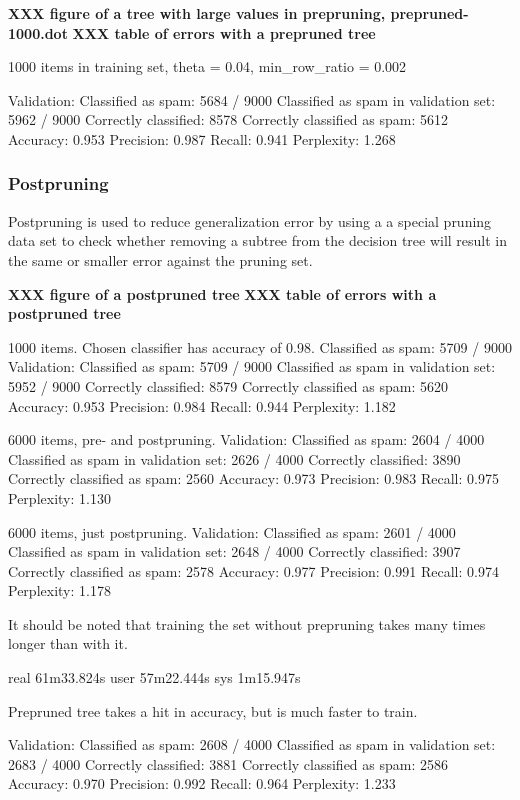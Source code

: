 \documentclass[a4paper,10pt]{article}
\newcommand{\XXX}[1]{{\bf XXX #1}}
\begin{document}
\XXX{figure of a tree with large values in prepruning, prepruned-1000.dot}
\XXX{table of errors with a prepruned tree}

1000 items in training set, theta = 0.04, min\_row\_ratio = 0.002


Validation:
 Classified as spam: 5684 / 9000
 Classified as spam in validation set: 5962 / 9000
 Correctly classified: 8578
 Correctly classified as spam: 5612
 Accuracy: 0.953
 Precision: 0.987
 Recall: 0.941
 Perplexity: 1.268

\subsubsection{Postpruning}
\label{sect:postpruning}

Postpruning is used to reduce generalization error by using a a special
pruning data set to check whether removing a subtree from the decision
tree will result in the same or smaller error against the pruning set.

\XXX{figure of a postpruned tree}
\XXX{table of errors with a postpruned tree}

1000 items.
Chosen classifier has accuracy of 0.98.
Classified as spam: 5709 / 9000
Validation:
 Classified as spam: 5709 / 9000
 Classified as spam in validation set: 5952 / 9000
 Correctly classified: 8579
 Correctly classified as spam: 5620
 Accuracy: 0.953
 Precision: 0.984
 Recall: 0.944
 Perplexity: 1.182

6000 items, pre- and postpruning.
Validation:
 Classified as spam: 2604 / 4000
 Classified as spam in validation set: 2626 / 4000
 Correctly classified: 3890
 Correctly classified as spam: 2560
 Accuracy: 0.973
 Precision: 0.983
 Recall: 0.975
 Perplexity: 1.130

6000 items, just postpruning.
Validation:
 Classified as spam: 2601 / 4000
 Classified as spam in validation set: 2648 / 4000
 Correctly classified: 3907
 Correctly classified as spam: 2578
 Accuracy: 0.977
 Precision: 0.991
 Recall: 0.974
 Perplexity: 1.178

It should be noted that training the set without prepruning takes many
times longer than with it.

real	61m33.824s
user	57m22.444s
sys	1m15.947s

Prepruned tree takes a hit in accuracy, but is much faster to train.

Validation:
 Classified as spam: 2608 / 4000
 Classified as spam in validation set: 2683 / 4000
 Correctly classified: 3881
 Correctly classified as spam: 2586
 Accuracy: 0.970
 Precision: 0.992
 Recall: 0.964
 Perplexity: 1.233
\end{document}
